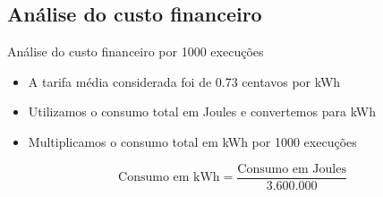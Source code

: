 \subsection{Análise do custo financeiro}
\begin{frame}{Análise do custo financeiro por 1000 execuções}
    \begin{itemize}
        \item A tarifa média considerada foi de 0.73 centavos por kWh
        \item Utilizamos o consumo total em Joules e convertemos para kWh
        \item Multiplicamos o consumo total em kWh por 1000 execuções
    \end{itemize}
 

    \begin{equation}
        \text{{Consumo em kWh}} = \frac{{\text{{Consumo em Joules}}}}{{3.600.000}}
    \end{equation}
\end{frame}

